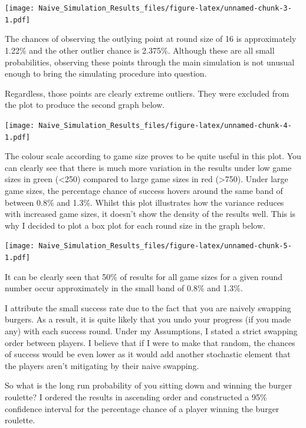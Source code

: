 \documentclass[]{article}
\newenvironment{Shaded}{\begin{snugshade}}{\end{snugshade}}
\newcommand{\KeywordTok}[1]{\textcolor[rgb]{0.13,0.29,0.53}{\textbf{#1}}}
\newcommand{\FloatTok}[1]{\textcolor[rgb]{0.00,0.00,0.81}{#1}}
\newcommand{\StringTok}[1]{\textcolor[rgb]{0.31,0.60,0.02}{#1}}
\newcommand{\OperatorTok}[1]{\textcolor[rgb]{0.81,0.36,0.00}{\textbf{#1}}}
\newcommand{\NormalTok}[1]{#1}
\begin{document}
\texttt{[image: Naive\_Simulation\_Results\_files/figure-latex/unnamed-chunk-3-1.pdf]}

The chances of observing the outlying point at round size of 16 is
approximately 1.22\% and the other outlier chance is 2.375\%. Although
these are all small probabilities, observing these points through the
main simulation is not unusual enough to bring the simulating procedure
into question.

Regardless, those points are clearly extreme outliers. They were
excluded from the plot to produce the second graph below.

\texttt{[image: Naive\_Simulation\_Results\_files/figure-latex/unnamed-chunk-4-1.pdf]}

The colour scale according to game size proves to be quite useful in
this plot. You can clearly see that there is much more variation in the
results under low game sizes in green (\textless{}250) compared to large
game sizes in red (\textgreater{}750). Under large game sizes, the
percentage chance of success hovers around the same band of between
0.8\% and 1.3\%. Whilst this plot illustrates how the variance reduces
with increased game sizes, it doesn't show the density of the results
well. This is why I decided to plot a box plot for each round size in
the graph below.

\texttt{[image: Naive\_Simulation\_Results\_files/figure-latex/unnamed-chunk-5-1.pdf]}

It can be clearly seen that 50\% of results for all game sizes for a
given round number occur approximately in the small band of 0.8\% and
1.3\%.

I attribute the small success rate due to the fact that you are naively
swapping burgers. As a result, it is quite likely that you undo your
progress (if you made any) with each success round. Under my
Assumptions, I stated a strict swapping order between players. I believe
that if I were to make that random, the chances of success would be even
lower as it would add another stochastic element that the players aren't
mitigating by their naive swapping.

So what is the long run probability of you sitting down and winning the
burger roulette? I ordered the results in ascending order and
constructed a 95\% confidence interval for the percentage chance of a
player winning the burger roulette.

\begin{Shaded}
\end{Shaded}
\end{document}
